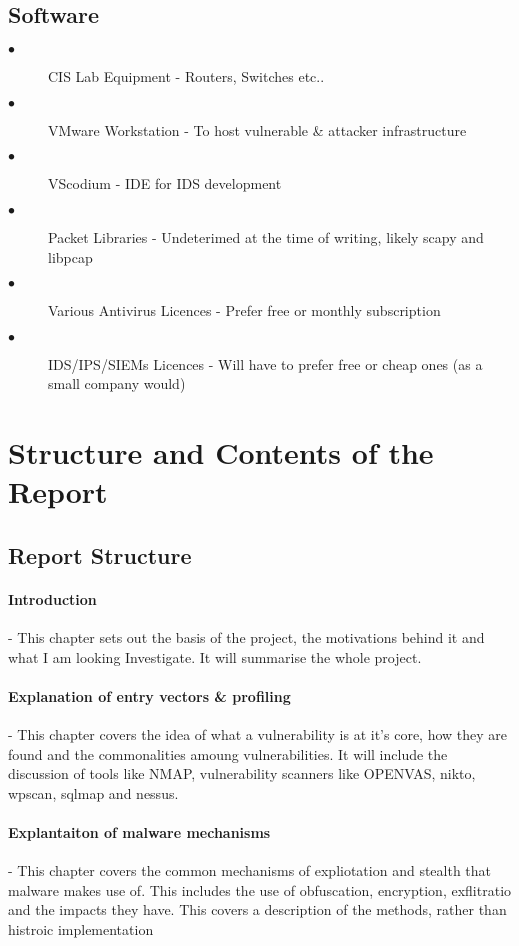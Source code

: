 \subsection{Software}
\begin{description}
	\item[$\bullet$] CIS Lab Equipment - Routers, Switches etc..
	\item[$\bullet$] VMware Workstation - To host vulnerable & attacker infrastructure
	\item[$\bullet$] VScodium - IDE for IDS development
	\item[$\bullet$] Packet Libraries - Undeterimed at the time of writing, likely scapy and libpcap
	\item[$\bullet$] Various Antivirus Licences - Prefer free or monthly subscription
	\item[$\bullet$] IDS/IPS/SIEMs Licences - Will have to prefer free or cheap ones (as a small company would)
\end{description}

\section{Structure and Contents of the Report}
\subsection{Report Structure}

\paragraph{Introduction}  -  This chapter sets out the basis of the project, the motivations behind it and what I am looking Investigate. 
It will summarise the whole project.

\paragraph{Explanation of entry vectors & profiling} - This chapter covers the idea of what a vulnerability is at it's core, how they are found
and the commonalities amoung vulnerabilities. It will include the discussion of tools like NMAP, vulnerability scanners like OPENVAS, nikto, wpscan, sqlmap and nessus.

\paragraph{Explantaiton of malware mechanisms} - This chapter covers the common mechanisms of expliotation and stealth that malware makes use of. 
This includes the use of obfuscation, encryption, exflitratio and the impacts they have. This covers a description of the methods, rather than histroic implementation

